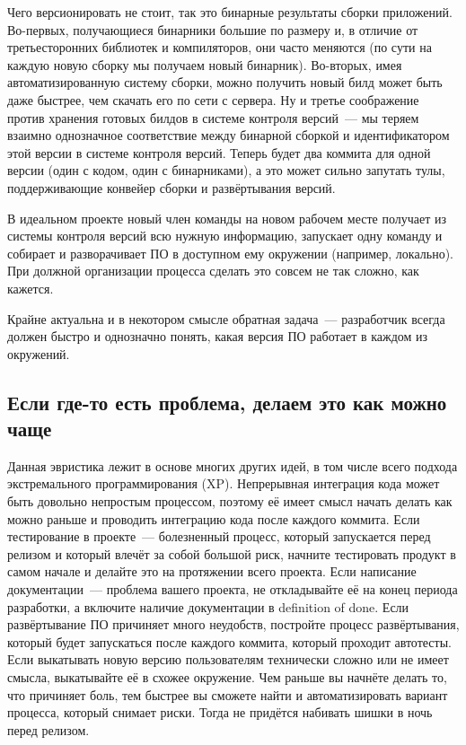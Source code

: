 \documentclass{../../text-style}
\begin{document}
Чего версионировать не стоит, так это бинарные результаты сборки приложений. Во-первых, получающиеся бинарники большие по размеру и, в отличие от третьесторонних библиотек и компиляторов, они часто меняются (по сути на каждую новую сборку мы получаем новый бинарник). Во-вторых, имея автоматизированную систему сборки, можно получить новый билд может быть даже быстрее, чем скачать его по сети с сервера. Ну и третье соображение против хранения готовых билдов в системе контроля версий~--- мы теряем взаимно однозначное соответствие между бинарной сборкой и идентификатором этой версии в системе контроля версий. Теперь будет два коммита для одной версии (один с кодом, один с бинарниками), а это может сильно запутать тулы, поддерживающие конвейер сборки и развёртывания версий.

В идеальном проекте новый член команды на новом рабочем месте получает из системы контроля версий всю нужную информацию, запускает одну команду и собирает и разворачивает ПО в доступном ему окружении (например, локально). При должной организации процесса сделать это совсем не так сложно, как кажется.

Крайне актуальна и в некотором смысле обратная задача~--- разработчик всегда должен быстро и однозначно понять, какая версия ПО работает в каждом из окружений.

\subsection{Если где-то есть проблема, делаем это как можно чаще}

Данная эвристика лежит в основе многих других идей, в том числе всего подхода экстремального программирования (XP). Непрерывная интеграция кода может быть довольно непростым процессом, поэтому её имеет смысл начать делать как можно раньше и проводить интеграцию кода после каждого коммита. Если тестирование в проекте~--- болезненный процесс, который запускается перед релизом и который влечёт за собой большой риск, начните тестировать продукт в самом начале и делайте это на протяжении всего проекта. Если написание документации~--- проблема вашего проекта, не откладывайте её на конец периода разработки, а включите наличие документации в definition of done. Если развёртывание ПО причиняет много неудобств, постройте процесс развёртывания, который будет запускаться после каждого коммита, который проходит автотесты. Если выкатывать новую версию пользователям технически сложно или не имеет смысла, выкатывайте её в схожее окружение. Чем раньше вы начнёте делать то, что причиняет боль, тем быстрее вы сможете найти и автоматизировать вариант процесса, который снимает риски. Тогда не придётся набивать шишки в ночь перед релизом.
\end{document}
